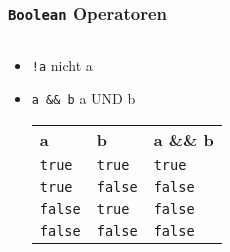 \documentclass{../../presentation}
\begin{document}
\begin{frame}[fragile]
  \frametitle{\texttt{Boolean} Operatoren}
  \pause
  \begin{columns}
    \begin{column}{0.5\textwidth}
      \begin{itemize}
        \item \texttt{!a} \quad \textrightarrow \quad nicht a
              \pause
        \item \texttt{a \&\& b} \quad \textrightarrow \quad a UND b\\[0.3em]
              \pause
              {
                \begin{tabular}{l l l}
                  \rowcolor{tablehead}
                  \textbf{a}     & \textbf{b}     & \textbf{a \&\& b} \\
                  \texttt{true}  & \texttt{true}  & \texttt{true}     \\
                  \texttt{true}  & \texttt{false} & \texttt{false}    \\
                  \texttt{false} & \texttt{true}  & \texttt{false}    \\
                  \texttt{false} & \texttt{false} & \texttt{false}    \\
                \end{tabular}
              }
      \end{itemize}
    \end{column}


\end{columns}
\end{frame}
\end{document}
